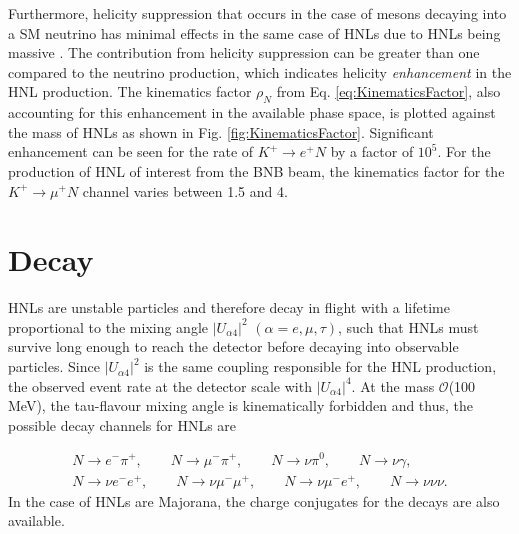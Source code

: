 Furthermore, helicity suppression that occurs in the case of mesons decaying into a SM neutrino has minimal effects in the same case of HNLs due to HNLs being massive \cite{HNLKelly}.
The contribution from helicity suppression can be greater than one compared to the neutrino production, which indicates helicity \textit{enhancement} in the HNL production.
The kinematics factor $\rho_{N}$ from Eq. \ref{eq:KinematicsFactor}, also accounting for this enhancement in the available phase space, is plotted against the mass of HNLs as shown in Fig. \ref{fig:KinematicsFactor}.
Significant enhancement can be seen for the rate of $K^{+}\rightarrow e^{+}N$ by a factor of $10^{5}$.
For the production of HNL of interest from the BNB beam, the kinematics factor for the $K^{+}\rightarrow \mu^{+}N$ channel varies between 1.5 and 4.


\section{Decay}

HNLs are unstable particles and therefore decay in flight with a lifetime proportional to the mixing angle $|U_{\alpha4}|^{2}$ $(\alpha=e,\mu,\tau)$, such that HNLs must survive long enough to reach the detector before decaying into observable particles.
Since $|U_{\alpha4}|^{2}$ is the same coupling responsible for the HNL production, the observed event rate at the detector scale with $|U_{\alpha4}|^{4}$.
At the mass $\mathcal{O}$(100 MeV), the tau-flavour mixing angle is kinematically forbidden and thus, the possible decay channels for HNLs are \cite{SBNHNL}

\begin{equation}
\begin{split}
	N\rightarrow e^{-}\pi^{+},\qquad 
	N\rightarrow \mu^{-}\pi^{+},\qquad
	N\rightarrow \nu \pi^{0},\qquad 
	N\rightarrow \nu \gamma,\qquad \\ 
	N\rightarrow \nu e^{-} e^{+},\qquad 
	N\rightarrow \nu \mu^{-} \mu^{+},\qquad 
	N\rightarrow \nu \mu^{-}e^{+},\qquad
	N\rightarrow \nu \nu \nu. 
\end{split}
\end{equation}
In the case of HNLs are Majorana, the charge conjugates for the decays are also available.

